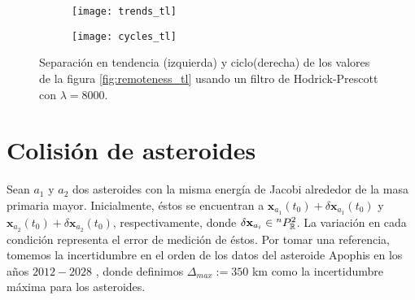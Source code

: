 \begin{figure}[h!]
\centering
\begin{subfigure}{0.49\textwidth}
	\centering
	\texttt{[image: trends\_tl]}
\end{subfigure}
%
\begin{subfigure}{0.49\textwidth}
	\centering
	\texttt{[image: cycles\_tl]}
\end{subfigure}
\caption{ Separación en tendencia (izquierda) y ciclo(derecha) de los valores de la figura \ref{fig:remoteness_tl} usando un filtro de Hodrick-Prescott con $\lambda = 8000$.}
\label{fig:trendcycle_tl}
\end{figure}

\pagebreak
\section{Colisión de asteroides}






Sean $a_1$ y $a_2$ dos asteroides con la misma energía de Jacobi alrededor de la masa primaria mayor. Inicialmente, éstos se encuentran a $\mathbf{x}_{a_1}(t_0) + \delta\mathbf{x}_{a_1}(t_0)$  y $\mathbf{x}_{a_2}(t_0) + \delta\mathbf{x}_{a_2}(t_0)$, respectivamente, donde $\delta\mathbf{x}_{a_i} \in {^{n}P_{\mathbb{R}}^ 2 }$. La variación en cada condición representa el error de medición de éstos. Por tomar una referencia, tomemos la incertidumbre en el orden de los datos del asteroide Apophis en los años $2012 - 2028$ \cite{Desmars2013}, donde definimos $\Delta_{max} := 350 $ km como la incertidumbre máxima para los asteroides.

